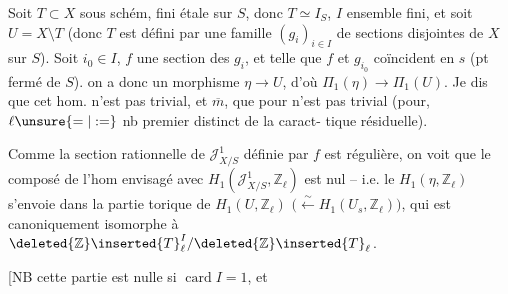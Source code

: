 Soit $T\subset X$ sous schém, fini étale sur $S$, donc $T\simeq I_S$, $I$ ensemble fini, et soit $U=X\setminus T$ (donc $T$ est défini par une famille $(g_i)_{i\in I}$ de sections disjointes de $X$ sur $S$).  Soit  $i_0\in I$, $f$ une section  des $g_i$, et telle que  $f$ et $g_{i_0}$ coïncident en $s$ (pt fermé de $S$).      on a donc un morphisme $\eta\longrightarrow U$, d'où $\Pi_1(\eta)\longrightarrow\Pi_1(U)$. Je dis que cet hom. n'est pas trivial,  et $\overline m$,  que pour 
n'est pas trivial (pour,  $\ell\unsure{=|:=}$ nb premier distinct de la caract-\newline
tique résiduelle).

Comme la section rationnelle de $\mathcal J^1_{X/S}$ définie par $f$ est régulière, on voit que le composé de l'hom envisagé avec $H_1(\mathcal J^1_{X/S},\mathbb Z_\ell)$ est nul -- i.e. le $H_1(\eta,\mathbb Z_\ell)$ s'envoie dans la partie torique de $H_1(U,\mathbb Z_\ell)$ $\bigl(\xleftarrow{\sim}H_1(U_s,\mathbb Z_\ell)\bigr)$, qui est canoniquement isomorphe à $\deleted{\mathbb Z}\inserted{T}_\ell^I/\deleted{\mathbb Z}\inserted{T}_\ell$.

[NB cette partie est nulle si $\operatorname{card}I=1$, et
